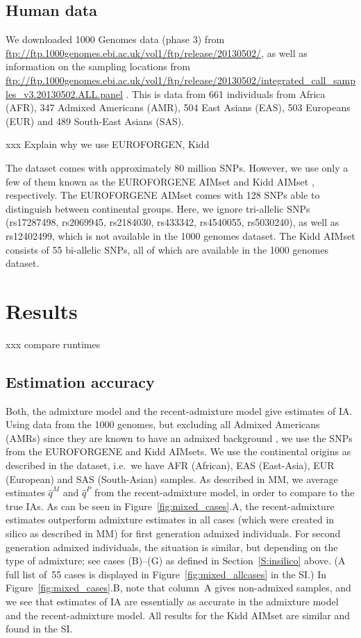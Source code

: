\documentclass[12pt]{article}
\theoremstyle{definition}
\begin{document}
\subsection{Human data}
\sloppy We downloaded 1000 Genomes data (phase 3) from
\url{ftp://ftp.1000genomes.ebi.ac.uk/vol1/ftp/release/20130502/}, as
well as information on the sampling locations from
\url{ftp://ftp.1000genomes.ebi.ac.uk/vol1/ftp/release/20130502/integrated_call_samples_v3.20130502.ALL.panel}
\cite{Auton2015}. This is data from 661 individuals from Africa (AFR),
347 Admixed Americans (AMR), 504 East Asians (EAS), 503 Europeans
(EUR) and 489 South-East Asians (SAS).

xxx Explain why we use EUROFORGEN, Kidd

The dataset comes with approximately 80 million SNPs.  However, we use
only a few of them known as the EUROFORGENE AIMset \cite{Phillips2014}
and Kidd AIMset \cite{Kidd2014}, respectively. The EUROFORGENE AIMset
comes with 128 SNPs able to distinguish between continental
groups. Here, we ignore tri-allelic SNPs (rs17287498, rs2069945,
rs2184030, rs433342, rs4540055, rs5030240), as well as rs12402499,
which is not available in the 1000 genomes dataset. The Kidd AIMset
consists of 55 bi-allelic SNPs, all of which are available in the 1000
genomes dataset.

\section{Results}

xxx compare runtimes

\subsection{Estimation accuracy}
Both, the admixture model and the recent-admixture model give
estimates of IA. Using data from the 1000 genomes, but excluding all
Admixed Americans (AMRs) since they are known to have an admixed
background \cite{Eduardoff2016, Pfaffelhuber2019}, we use the SNPs
from the EUROFORGENE and Kidd AIMsets. We use the continental origins
as described in the dataset, i.e.\ we have AFR (African), EAS
(East-Asia), EUR (European) and SAS (South-Asian) samples. As
described in MM, we average estimates $\hat q^M$ and $\hat q^P$ from
the recent-admixture model, in order to compare to the true IAs. As
can be seen in Figure~\ref{fig:mixed_cases}.A, the recent-admixture
estimates outperform admixture estimates in all cases (which were
created in silico as described in MM) for first generation admixed
individuals. For second generation admixed individuals, the situation
is similar, but depending on the type of admixture; see cases (B)--(G)
as defined in Section~\ref{S:insilico} above. (A full list of~55 cases
is displayed in Figure~\ref{fig:mixed_allcases} in the SI.) In
Figure~\ref{fig:mixed_cases}.B, note that column~A gives non-admixed
samples, and we see that estimates of IA are essentially as accurate
in the admixture model and the recent-admixture model. All results for
the Kidd AIMset are similar and found in the SI.
\end{document}
